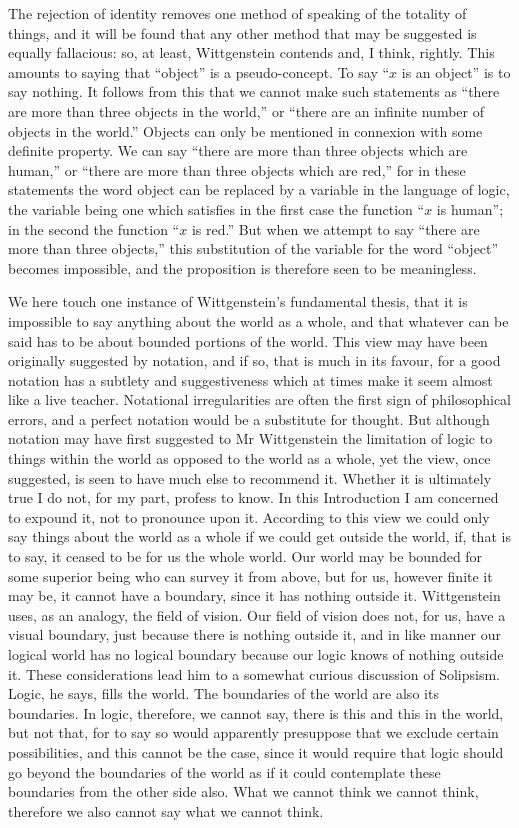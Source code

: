 The rejection of identity removes one method of
speaking of the totality of things, and it will be found
that any other method that may be suggested is equally
fallacious: so, at least, Wittgenstein contends and, I
think, rightly. This amounts to saying that ``object'' is
a pseudo-concept. To say ``$x$ is an object'' is to say
nothing. It follows from this that we cannot make such
statements as ``there are more than three objects in the
world,'' or ``there are an infinite number of objects in
the world.'' Objects can only be mentioned in connexion
with some definite property. We can say ``there are more
than three objects which are human,'' or ``there are more
than three objects which are red,'' for in these statements
the word object can be replaced by a variable in the
language of logic, the variable being one which satisfies
in the first case the function ``$x$ is human''; in the second
the function ``$x$ is red.'' But when we attempt to say
``there are more than three objects,'' this substitution of
the variable for the word ``object'' becomes impossible,
and the proposition is therefore seen to be meaningless.

We here touch one instance of Wittgenstein's fundamental
thesis, that it is impossible to say anything about
the world as a whole, and that whatever can be said has
to be about bounded portions of the world. This view
may have been originally suggested by notation, and if
so, that is much in its favour, for a good notation has
a subtlety and suggestiveness which at times make it
seem almost like a live teacher. Notational irregularities
are often the first sign of philosophical errors, and
a perfect notation would be a substitute for thought.
But although notation may have first suggested to
Mr Wittgenstein the limitation of logic to things within
the world as opposed to the world as a whole, yet the
view, once suggested, is seen to have much else to
recommend it. Whether it is ultimately true I do not,
for my part, profess to know. In this Introduction I
am concerned to expound it, not to pronounce upon it.
According to this view we could only say things about
the world as a whole if we could get outside the world,
if, that is to say, it ceased to be for us the whole world.
Our world may be bounded for some superior being who
can survey it from above, but for us, however finite it
may be, it cannot have a boundary, since it has nothing
outside it. Wittgenstein uses, as an analogy, the field
of vision. Our field of vision does not, for us, have a
visual boundary, just because there is nothing outside
it, and in like manner our logical world has no logical
boundary because our logic knows of nothing outside it.
These considerations lead him to a somewhat curious
discussion of Solipsism. Logic, he says, fills the world.
The boundaries of the world are also its boundaries. In
logic, therefore, we cannot say, there is this and this in
the world, but not that, for to say so would apparently
presuppose that we exclude certain possibilities, and this
cannot be the case, since it would require that logic
should go beyond the boundaries of the world as if it
could contemplate these boundaries from the other side
also. What we cannot think we cannot think, therefore
we also cannot say what we cannot think.


